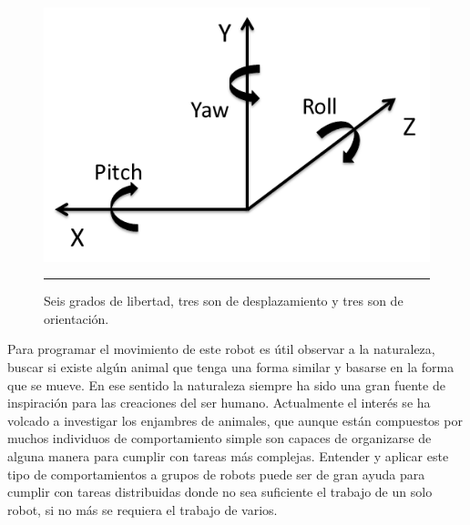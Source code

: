 \begin{figure}[htbp]
	\centering
		\includegraphics[width=\textwidth]{./Figures/6DOF.png}
		\rule{35em}{0.5pt}
	\caption[Grados de libertad]{Seis grados de libertad, tres son de desplazamiento y tres son de orientación.}
	\label{fig:grados de libertad}
\end{figure}

Para programar el movimiento de este robot es útil observar a la naturaleza, buscar si existe algún animal que tenga una forma similar y basarse en la forma que se mueve. En ese sentido la naturaleza siempre ha sido una gran fuente de inspiración para las creaciones del ser humano. Actualmente el interés se ha volcado a investigar los enjambres de animales, que aunque están compuestos por muchos individuos de comportamiento simple son capaces de organizarse de alguna manera para cumplir con tareas más complejas. Entender y aplicar este tipo de comportamientos a grupos de robots puede ser de gran ayuda para cumplir con tareas distribuidas donde no sea suficiente el trabajo de un solo robot, si no más se requiera el trabajo de varios.


